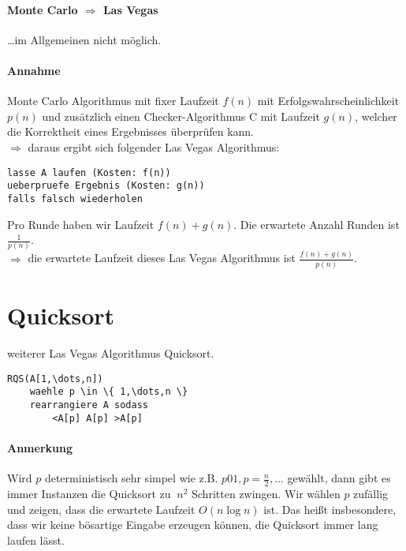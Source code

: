\paragraph*{Monte Carlo $\Rightarrow$ Las Vegas} \dots im Allgemeinen nicht möglich.
\paragraph*{Annahme} Monte Carlo Algorithmus mit fixer Laufzeit $f(n)$ mit Erfolgswahrscheinlichkeit $p(n)$ und zusätzlich einen Checker-Algorithmus C mit Laufzeit $g(n)$, welcher die Korrektheit eines Ergebnisses überprüfen kann. \\
$\Rightarrow$ daraus ergibt sich folgender Las Vegas Algorithmus:
\begin{lstlisting}
lasse A laufen (Kosten: f(n))
ueberpruefe Ergebnis (Kosten: g(n))
falls falsch wiederholen
\end{lstlisting}

Pro Runde haben wir Laufzeit $f(n)+g(n)$. Die erwartete Anzahl Runden ist $\frac{1}{p(n)}$. \\
$\Rightarrow$ die erwartete Laufzeit dieses Las Vegas Algorithmus ist $\frac{f(n)+g(n)}{p(n)}$.

\section{Quicksort}
weiterer Las Vegas Algorithmus Quicksort.
\begin{lstlisting}[mathescape]
RQS(A[1,\dots,n])
	waehle p \in \{ 1,\dots,n \}
	rearrangiere A sodass
		<A[p] A[p] >A[p]
\end{lstlisting}

\paragraph*{Anmerkung} Wird $p$ deterministisch sehr simpel wie z.B. $p01,p=\frac{n}{2},\dots$ %
gewählt, dann gibt es immer Instanzen die Quicksort zu $~n^2$ Schritten zwingen.
Wir wählen $p$ zufällig und zeigen, dass die erwartete Laufzeit $O(n \log n)$ ist. Das heißt insbesondere, dass wir keine bösartige Eingabe erzeugen können, die Quicksort immer lang laufen lässt.

